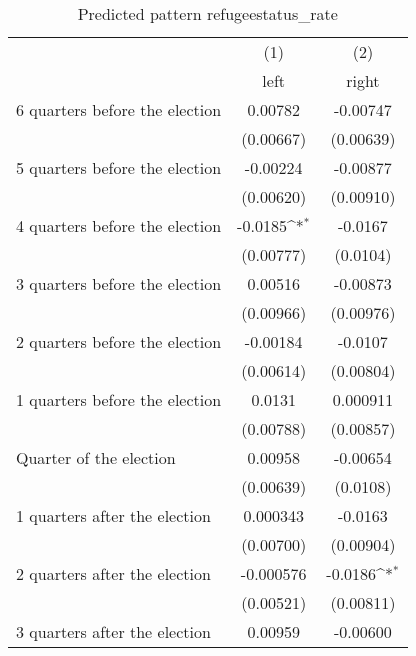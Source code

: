 \begin{table}[htbp]\centering
\def\sym#1{\ifmmode^{#1}\else\(^{#1}\)\fi}
\caption{Predicted pattern refugeestatus\_rate}
\begin{tabular}{l*{2}{c}}
\hline\hline
                    &\multicolumn{1}{c}{(1)}&\multicolumn{1}{c}{(2)}\\
                    &\multicolumn{1}{c}{left}&\multicolumn{1}{c}{right}\\
\hline
 6 quarters before the election&     0.00782         &    -0.00747         \\
                    &   (0.00667)         &   (0.00639)         \\
[1em]
 5 quarters before the election&    -0.00224         &    -0.00877         \\
                    &   (0.00620)         &   (0.00910)         \\
[1em]
 4 quarters before the election&     -0.0185\sym{*}  &     -0.0167         \\
                    &   (0.00777)         &    (0.0104)         \\
[1em]
 3 quarters before the election&     0.00516         &    -0.00873         \\
                    &   (0.00966)         &   (0.00976)         \\
[1em]
 2 quarters before the election&    -0.00184         &     -0.0107         \\
                    &   (0.00614)         &   (0.00804)         \\
[1em]
 1 quarters before the election&      0.0131         &    0.000911         \\
                    &   (0.00788)         &   (0.00857)         \\
[1em]
Quarter of the election&     0.00958         &    -0.00654         \\
                    &   (0.00639)         &    (0.0108)         \\
[1em]
 1 quarters after the election&    0.000343         &     -0.0163         \\
                    &   (0.00700)         &   (0.00904)         \\
[1em]
 2 quarters after the election&   -0.000576         &     -0.0186\sym{*}  \\
                    &   (0.00521)         &   (0.00811)         \\
[1em]
 3 quarters after the election&     0.00959         &    -0.00600         \\

\end{tabular}
\end{table}
